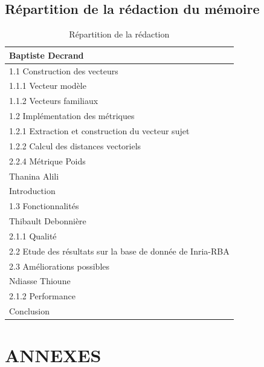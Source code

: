 \documentclass[a4paper, 12pt]{book}
\begin{document}
\section*{Répartition de la rédaction du mémoire}
\begin{table}[!h]
\begin{center}
\begin{tabular}{|l|}
	\rowcolor{gray}
   \hline
   Baptiste Decrand\\
   \hline
   1.1 Construction des vecteurs\\
   \hline
   1.1.1 Vecteur modèle\\
   \hline
   1.1.2 Vecteurs familiaux\\
   \hline
   1.2 Implémentation des métriques\\
   \hline
   1.2.1 Extraction et construction du vecteur sujet\\
   \hline
    1.2.2 Calcul des distances vectoriels\\
   \hline
    2.2.4 Métrique Poids\\
	\rowcolor{gray}
   \hline
   Thanina Alili\\
   \hline
   Introduction\\
   \hline
   1.3 Fonctionnalités\\
	\rowcolor{gray}
    \hline
   Thibault Debonnière\\
   \hline
   2.1.1 Qualité\\
   \hline
   2.2 Etude des résultats sur la base de donnée de Inria-RBA\\
   \hline
   2.3 Améliorations possibles\\
	\rowcolor{gray}
    \hline
   	Ndiasse Thioune\\
    \hline
    2.1.2 Performance\\
   	\hline
   	Conclusion\\
   	\hline
\end{tabular}
\end{center}
\caption{Répartition de la rédaction}
\label{RépartitionRédaction}
\end{table}
\newpage
\chapter*{ANNEXES}
\newpage
\end{document}
